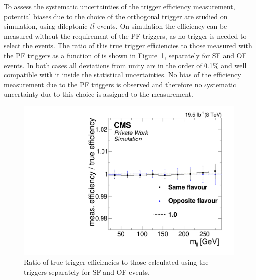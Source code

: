 To assess the systematic uncertainties of the trigger efficiency measurement, potential biases due to the choice of the orthogonal trigger  are studied on simulation, using dileptonic $t\bar{t}$ events. On simulation the efficiency can be measured without the requirement of the PF \HT triggers, as no trigger is needed to select the events. The ratio of this true trigger efficiencies to those measured with the PF \HT triggers as a function of \mll is shown in Figure~\ref{fig:triggerEffBias}, separately for SF and OF events. In both cases all deviations from unity are in the order of 0.1\% and well compatible with it inside the statistical uncertainties. No bias of the efficiency measurement due to the PF \HT triggers is observed and therefore no systematic uncertainty due to this choice is assigned to the measurement.
\begin{figure}
\begin{center}
\includegraphics[scale=0.35]{plots/BG/trigger/Triggereff_AlphaTSyst_PFHT_HighHTExclusive_Full2012_Mll_None.pdf}
\caption{Ratio of true trigger efficiencies to those calculated using the \HT triggers separately for SF and OF events.}
\label{fig:triggerEffBias}
\end{center}
\end{figure}
